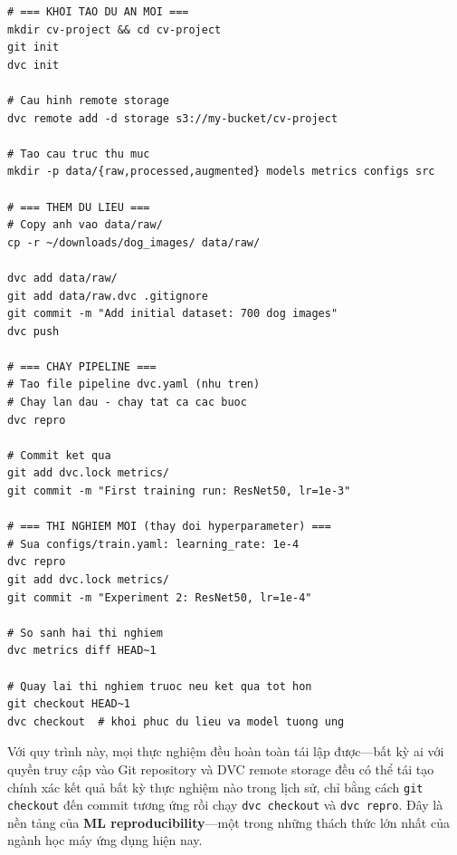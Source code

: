 \begin{verbatim}
# === KHOI TAO DU AN MOI ===
mkdir cv-project && cd cv-project
git init
dvc init

# Cau hinh remote storage
dvc remote add -d storage s3://my-bucket/cv-project

# Tao cau truc thu muc
mkdir -p data/{raw,processed,augmented} models metrics configs src

# === THEM DU LIEU ===
# Copy anh vao data/raw/
cp -r ~/downloads/dog_images/ data/raw/

dvc add data/raw/
git add data/raw.dvc .gitignore
git commit -m "Add initial dataset: 700 dog images"
dvc push

# === CHAY PIPELINE ===
# Tao file pipeline dvc.yaml (nhu tren)
# Chay lan dau - chay tat ca cac buoc
dvc repro

# Commit ket qua
git add dvc.lock metrics/
git commit -m "First training run: ResNet50, lr=1e-3"

# === THI NGHIEM MOI (thay doi hyperparameter) ===
# Sua configs/train.yaml: learning_rate: 1e-4
dvc repro
git add dvc.lock metrics/
git commit -m "Experiment 2: ResNet50, lr=1e-4"

# So sanh hai thi nghiem
dvc metrics diff HEAD~1

# Quay lai thi nghiem truoc neu ket qua tot hon
git checkout HEAD~1
dvc checkout  # khoi phuc du lieu va model tuong ung
\end{verbatim}

Với quy trình này, mọi thực nghiệm đều hoàn toàn tái lập được---bất kỳ ai với quyền truy cập vào Git repository và DVC remote storage đều có thể tái tạo chính xác kết quả bất kỳ thực nghiệm nào trong lịch sử, chỉ bằng cách \texttt{git checkout} đến commit tương ứng rồi chạy \texttt{dvc checkout} và \texttt{dvc repro}. Đây là nền tảng của \textbf{ML reproducibility}---một trong những thách thức lớn nhất của ngành học máy ứng dụng hiện nay.
